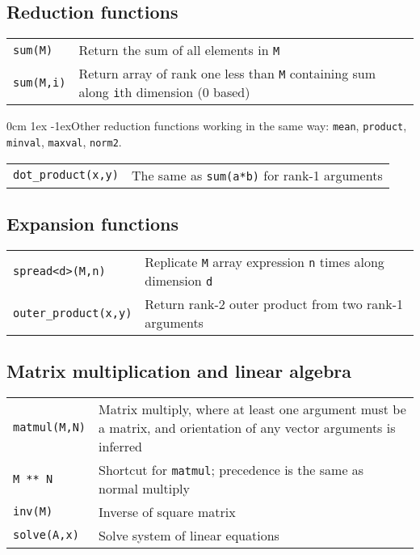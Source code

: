 \documentclass[10pt,a4,landscape]{article}
\def\hangingpar{\parshape 2 0cm \linewidth 1ex \dimexpr\linewidth-1ex\relax}
\def\code#1{\texttt{#1}}
\begin{document}
\subsection*{Reduction functions}
\begin{tabular}{ll}
\code{sum(M)} & Return the sum of all elements in \code{M}\\
\code{sum(M,i)} & Return array of rank one less than \code{M} containing sum along \code{i}th dimension (0 based)\\
\end{tabular}

\hangingpar Other reduction functions working in the same way:
\code{mean}, \code{product}, \code{minval}, \code{maxval}, \code{norm2}.

\begin{tabular}{ll}
\code{dot\_product(x,y)} & The same as \code{sum(a*b)} for rank-1
arguments\\
\end{tabular}
\subsection*{Expansion functions}
\begin{tabular}{ll}
\code{spread<d>(M,n)} & Replicate \code{M} array expression \code{n}
times along dimension \code{d}\\
\code{outer\_product(x,y)} & Return rank-2 outer product from two
rank-1 arguments\\
\end{tabular}
\subsection*{Matrix multiplication and linear algebra}
\begin{tabular}{ll}
\code{matmul(M,N)} & Matrix multiply, where at least one argument must
be a matrix, and orientation of any vector arguments is inferred\\
\code{M ** N} & Shortcut for \code{matmul}; precedence is the same as normal
  multiply\\
\code{inv(M)} & Inverse of square matrix\\
\code{solve(A,x)} & Solve system of linear equations\\ 
\end{tabular}

\onecolumn

\newpage

\def\Y{\textbf{Y}}
\def\r#1{\rotatebox{90}{#1}}
\end{document}
